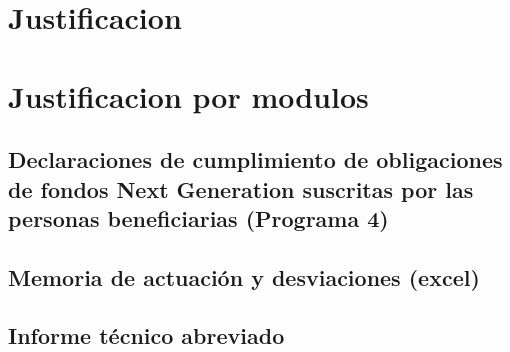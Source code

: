 \documentclass{article}
\begin{document}
\section{Justificacion}
\section{Justificacion por modulos}

\subsection{Declaraciones de cumplimiento de obligaciones de fondos Next Generation suscritas por las personas beneficiarias (Programa 4) }

\subsection{Memoria de actuación y desviaciones (excel)}
% 
\subsection{Informe técnico abreviado }

\end{document}
